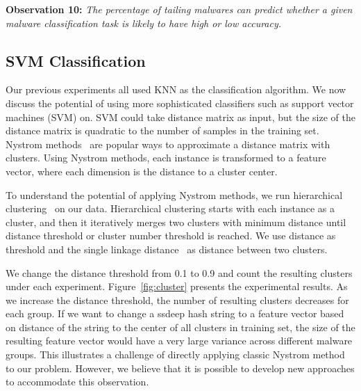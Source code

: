 {\bf Observation 10:} 
{\em The percentage of tailing malwares
can predict whether a given malware classification task is likely to have high or low accuracy.}



\subsection{SVM Classification}
Our previous experiments all used KNN as the classification algorithm.
We now discuss the potential of using
more sophisticated classifiers such as
support vector machines (SVM) on. 
SVM could take distance matrix as input,
but the size of the distance matrix is quadratic to the number of samples in the training set. 
Nystrom methods~\cite{clustering-purpose} are popular ways to
approximate a distance matrix with clusters.
Using Nystrom methods, each instance is transformed to a feature vector, where each dimension is the distance to a cluster center. 

To understand the potential of applying Nystrom methods, we run hierarchical clustering~\cite{hcluster} on our data.
Hierarchical clustering starts with each instance as a cluster, 
and then it iteratively merges two clusters with minimum distance 
until distance threshold or cluster number threshold is reached. 
We use distance as threshold and the single linkage distance~\cite{single-link} as distance between two clusters. 

We change the distance threshold from 0.1 to 0.9
and count the resulting clusters under each experiment. 
Figure~\ref{fig:cluster} presents the experimental results.
As we increase the distance threshold, the number of resulting clusters decreases for each group. 
If we want to change a ssdeep hash string to a feature vector
based on distance of the string to the center of all clusters in training set, 
the size of the resulting feature vector would have a very large variance across different malware groups. 
This illustrates a challenge of directly applying
classic Nystrom method to our problem. 
However, we believe that it is possible to develop new approaches to
accommodate this observation.

